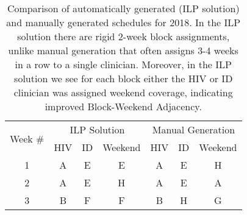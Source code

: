 \begin{table}[htbp]
  \centering
  \caption{Comparison of automatically generated (ILP solution) and manually generated schedules for 2018. In the ILP solution there are rigid 2-week block assignments, unlike manual generation that often assigns 3-4 weeks in a row to a single clinician. Moreover, in the ILP solution we see for each block either the HIV or ID clinician was assigned weekend coverage, indicating improved Block-Weekend Adjacency.}%
  \label{tbl:2018-schedule-comparison}%
	\begin{adjustbox}{scale=0.8}
    \begin{tabular}{c||ccc||ccc}
    	\multicolumn{1}{c||}{\multirow{2}[1]{*}{Week \#}} &                                                                       \multicolumn{3}{c||}{ILP Solution}                                                                        &                                                                      \multicolumn{3}{c}{Manual Generation}                                                                      \\
    	                                                  &                  HIV                  &                                 ID                                 &                              Weekend                               &                  HIV                  &                                 ID                                 &                              Weekend                               \\ \midrule\midrule
    	                        1                         & \cellcolor[rgb]{ .663,  .816,  .557}A &                \cellcolor[rgb]{ .957,  .69,  .518}E                &                \cellcolor[rgb]{ .957,  .69,  .518}E                & \cellcolor[rgb]{ .663,  .816,  .557}A &                \cellcolor[rgb]{ .957,  .69,  .518}E                &               \cellcolor[rgb]{ .459,  .443,  .443}H                \\
    	                        2                         & \cellcolor[rgb]{ .663,  .816,  .557}A &                \cellcolor[rgb]{ .957,  .69,  .518}E                &               \cellcolor[rgb]{ .459,  .443,  .443}H                & \cellcolor[rgb]{ .663,  .816,  .557}A &                \cellcolor[rgb]{ .957,  .69,  .518}E                &               \cellcolor[rgb]{ .663,  .816,  .557}A                \\
    	                        3                         & \cellcolor[rgb]{ .608,  .761,  .902}B &               \cellcolor[rgb]{ .557,  .663,  .859}F                &               \cellcolor[rgb]{ .557,  .663,  .859}F                & \cellcolor[rgb]{ .608,  .761,  .902}B &               \cellcolor[rgb]{ .459,  .443,  .443}H                &                \cellcolor[rgb]{ .518,  .592,  .69}G                \\

\end{tabular}
\end{adjustbox}
\end{table}
